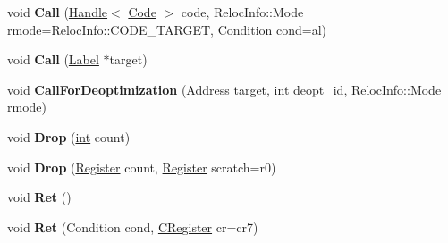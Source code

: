 \begin{DoxyCompactItemize}
\item 
\mbox{\label{classv8_1_1internal_1_1TurboAssembler_ad025fd0faa7114a3c2f4d3161610eaf9}} 
void {\bfseries Call} (\mbox{\hyperlink{classv8_1_1internal_1_1Handle}{Handle}}$<$ \mbox{\hyperlink{classv8_1_1internal_1_1Code}{Code}} $>$ code, Reloc\+Info\+::\+Mode rmode=Reloc\+Info\+::\+C\+O\+D\+E\+\_\+\+T\+A\+R\+G\+ET, Condition cond=al)
\item 
\mbox{\label{classv8_1_1internal_1_1TurboAssembler_a76c1a7002369fba1c520446e9e4cfc34}} 
void {\bfseries Call} (\mbox{\hyperlink{classv8_1_1internal_1_1Label}{Label}} $\ast$target)
\item 
\mbox{\label{classv8_1_1internal_1_1TurboAssembler_a8fe9aeaba65f21a5f48bbf9ad66fa18d}} 
void {\bfseries Call\+For\+Deoptimization} (\mbox{\hyperlink{classuintptr__t}{Address}} target, \mbox{\hyperlink{classint}{int}} deopt\+\_\+id, Reloc\+Info\+::\+Mode rmode)
\item 
\mbox{\label{classv8_1_1internal_1_1TurboAssembler_a5b5d206203d10e233f13ba0d31b0c7e2}} 
void {\bfseries Drop} (\mbox{\hyperlink{classint}{int}} count)
\item 
\mbox{\label{classv8_1_1internal_1_1TurboAssembler_aec13b30f60496cc2acde88ba525f446d}} 
void {\bfseries Drop} (\mbox{\hyperlink{classv8_1_1internal_1_1Register}{Register}} count, \mbox{\hyperlink{classv8_1_1internal_1_1Register}{Register}} scratch=r0)
\item 
\mbox{\label{classv8_1_1internal_1_1TurboAssembler_aef6d2d20b513c5155a12a3973e0e46d6}} 
void {\bfseries Ret} ()
\item 
\mbox{\label{classv8_1_1internal_1_1TurboAssembler_a628bfaf1a0fc90a752412a4ec44b103b}} 
void {\bfseries Ret} (Condition cond, \mbox{\hyperlink{classv8_1_1internal_1_1CRegister}{C\+Register}} cr=cr7)
\item 
\mbox{\label{classv8_1_1internal_1_1TurboAssembler_a4f90e9e942eae4da1b6d14894fef318b}} 

\end{DoxyCompactItemize}
